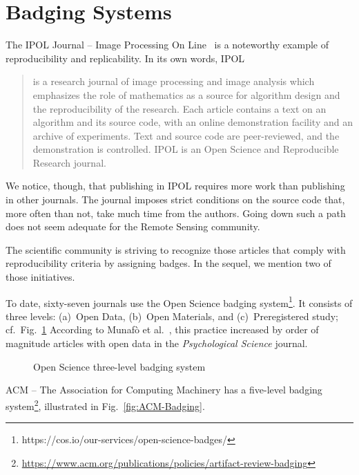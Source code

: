 \documentclass[journal,twoside]{IEEEtran}
\begin{document}
\section{Badging Systems}\label{Sec:BadgingSystems}

The IPOL Journal -- Image Processing On Line~\cite{IPOL} is a noteworthy example of reproducibility and replicability.
In its own words, IPOL
\begin{quote}
	is a research journal of image processing and image analysis which emphasizes the role of mathematics as a source for algorithm design and the reproducibility of the research. Each article contains a text on an algorithm and its source code, with an online demonstration facility and an archive of experiments. Text and source code are peer-reviewed, and the demonstration is controlled. IPOL is an Open Science and Reproducible Research journal.
\end{quote}

We notice, though, that publishing in IPOL requires more work than publishing in other journals. 
The journal imposes strict conditions on the source code that, more often than not, take much time from the authors.
Going down such a path does not seem adequate for the Remote Sensing community.

The scientific community is striving to recognize those articles that comply with reproducibility criteria by assigning badges.
In the sequel, we mention two of those initiatives.

To date, sixty-seven journals use the Open Science badging system\footnote{https://cos.io/our-services/open-science-badges/}.
It consists of three levels: (a)~Open Data, (b)~Open Materials, and (c)~Preregistered study; cf.\
Fig.~\ref{Fig:OpenScienceBadges}
According to Munaf\`o et al.~\cite{ManifestoReproducibleScience}, this practice increased by order of magnitude articles with open data in the \textit{Psychological Science} journal.

\begin{figure}[hbt]
	\centering
	\caption{Open Science three-level badging system}\label{Fig:OpenScienceBadges}
\end{figure}

ACM -- The Association for Computing Machinery has a five-level badging system\footnote{ \url{https://www.acm.org/publications/policies/artifact-review-badging}}, illustrated in Fig.~\ref{fig:ACM-Badging}.
\end{document}
